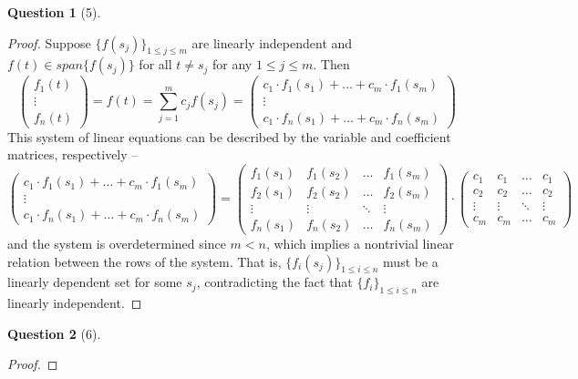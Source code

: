 \documentclass[11pt]{article}
\theoremstyle{quest}
\newtheorem*{question}{Question}
\begin{document}
\begin{question}[5]
\end{question}
\begin{proof}
Suppose $\{f(s_j)\}_{1 \le j \le m}$ are linearly independent and $f(t) \in span\{f(s_j)\}$ for all $t \ne s_j$ for any $1 \le j \le m$. Then
$$\begin{pmatrix}
f_1(t) \\
\vdots \\
f_n(t)
\end{pmatrix} = f(t) = \sum_{j=1}^m c_j f(s_j) = \begin{pmatrix}
c_1 \cdot f_1(s_1) + \ldots + c_m \cdot f_1(s_m) \\
\vdots \\
c_1 \cdot f_n(s_1) + \ldots + c_m \cdot f_n(s_m)
\end{pmatrix}$$
This system of linear equations can be described by the variable and coefficient matrices, respectively -- 
$$\begin{pmatrix}
c_1 \cdot f_1(s_1) + \ldots + c_m \cdot f_1(s_m) \\
\vdots \\
c_1 \cdot f_n(s_1) + \ldots + c_m \cdot f_n(s_m)
\end{pmatrix} = \begin{pmatrix}
f_1(s_1) & f_1(s_2) & \ldots & f_1(s_m) \\
f_2(s_1) & f_2(s_2) & \ldots & f_2(s_m) \\
\vdots & \vdots & \ddots & \vdots \\
f_n(s_1) & f_n(s_2) & \ldots & f_n(s_m)
\end{pmatrix} \cdot \begin{pmatrix} c_1 & c_1 & \ldots & c_1 \\
c_2 & c_2 & \ldots & c_2 \\
\vdots & \vdots & \ddots & \vdots \\
c_m & c_m & \ldots & c_m
\end{pmatrix}$$
and the system is overdetermined since $m < n$, 
which implies a nontrivial linear relation between the rows of the system. That is, $\{f_i(s_j)\}_{1 \le i \le n}$ must be a linearly dependent set for some $s_j$, contradicting the fact that $\{f_i\}_{1 \le i \le n}$ are linearly independent.
\end{proof}

\begin{question}[6]
\end{question}
\begin{proof}

\end{proof}
\end{document}
